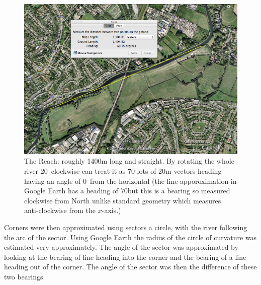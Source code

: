       \begin{figure}
      \begin{center}
        \includegraphics[scale=0.3]{images/TheReach.png}
        \caption{The Reach: roughly 1400m long and straight. By rotating the whole river 20\textdegree \ clockwise can treat it as 70 lots of 20m vectors heading having an angle of 0\textdegree \ from the horizontal (the line apporoximation in Google Earth has a heading of 70\textdegree but this is a bearing so measured clockwise from North unlike standard geometry which measures anti-clockwise from the $x$-axis.)}
        \label{fig:thereach}
      \end{center}
      \end{figure}
      
      Corners were then approximated using sectors a circle, with the river following the arc of the sector. Using Google Earth the radius of the circle of curvature was estimated very approximately. The angle of the sector was approximated by looking at the bearing of line heading into the corner and the bearing of a line heading out of the corner. The angle of the sector was then the difference of these two bearings.
      
